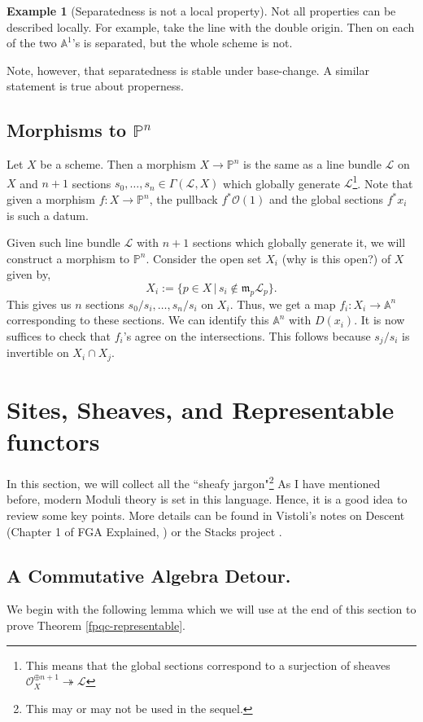 \documentclass[11pt]{amsart}
\newcommand{\sL}{{\mathcal L}}
\newcommand{\sO}{{\mathcal O}}
\newcommand{\A}{{\mathbb A}}
\renewcommand{\P}{{\mathbb P}}
\theoremstyle{definition}
\newtheorem{example}[theorem]{Example}
\begin{document}
\begin{example}[Separatedness is not a local property] Not all properties can be described locally. For example, take the line with the double origin. Then on each of the two $\A^1$'s is separated, but the whole scheme is not. 
	
Note, however, that separatedness is stable under base-change. A similar statement is true about properness.
	
\end{example}


\subsection{Morphisms to \texorpdfstring{$\P^n$}{Pn}}\label{functor-of-Pn} Let $X$ be a scheme. Then a morphism $X\rightarrow\P^n$ is the same as a line bundle $\sL$ on $X$ and $n+1$ sections $s_0,\ldots,s_n \in \Gamma (\sL,X)$ which globally generate $\sL$\footnote{This means that the global sections correspond to a surjection of sheaves $\sO_X^{\oplus n+1}\twoheadrightarrow \sL$}. Note that given a morphism $f: X\rightarrow \P^n$, the pullback $f^* \sO(1)$ and the global sections $f^*x_i$ is such a datum.

Given such line bundle $\sL$ with $n+1$ sections which globally generate it, we will construct a morphism to $\P^n$. Consider the open set $X_i$ (why is this open?) of $X$ given by,
\[X_i:=\lbrace p\in X \, |\, s_i\notin \mathfrak{m}_p\sL_p\rbrace.\]
This gives us $n$ sections $s_0/s_i,\ldots,s_n/s_i$ on $X_i$. Thus, we get a map $f_i:X_i\rightarrow \A^n$ corresponding to these sections. We can identify this $\A^n$ with $D(x_i)$. It is now suffices to check that $f_i$'s agree on the intersections. This follows because $s_j/s_i$ is invertible on $X_i\cap X_j$.


\section{Sites, Sheaves, and Representable functors}\label{section-sites}

In this section, we will collect all the ``sheafy jargon"\footnote{This may or may not be used in the sequel.} As I have mentioned before, modern Moduli theory is set in this language. Hence, it is a good idea to review some key points. More details can be found in Vistoli's notes on Descent (Chapter 1 of FGA Explained, \cite{FGAExplained}) or the Stacks project \cite{stacks-project}.

\subsection{A Commutative Algebra Detour.}
We begin with the following lemma which we will use at the end of this section to prove Theorem \ref{fpqc-representable}.
\end{document}
